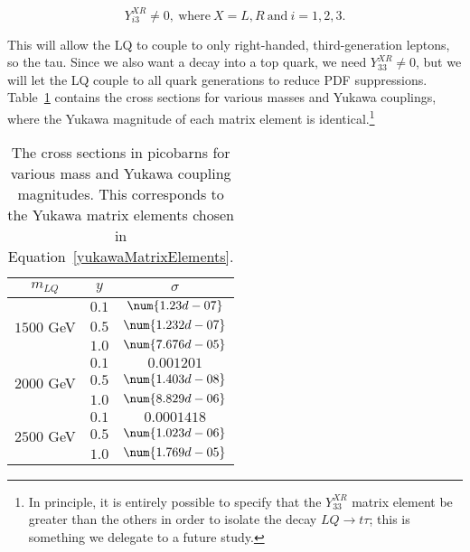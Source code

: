         \begin{equation}
            Y^{XR}_{i3} \neq 0,\ \text{where}\ X=L,R\ \text{and}\ i=1,2,3.
        \end{equation}\label{yukawaMatrixElements}

         This will allow the LQ to couple to only right-handed, third-generation leptons, so the tau. Since we also want a decay into a top quark, we need $Y^{XR}_{33} \neq 0$, but we will let the LQ couple to all quark generations to reduce PDF suppressions. Table~\ref{crossSections} contains the cross sections for various masses and Yukawa couplings, where the Yukawa magnitude of each matrix element is identical.\footnote{In principle, it is entirely possible to specify that the $Y^{XR}_{33}$ matrix element be greater than the others in order to isolate the decay $LQ \rightarrow t\tau$; this is something we delegate to a future study.}

        \renewcommand{\arraystretch}{1.15}
        \begin{table}[tbh]
            \centering
            \begin{tabular}{c|c|c}
                $m_{LQ}$ & $y$ & $\sigma$ \\ \hline
                \multirow{3}{5em}{$1500$ GeV} & $0.1$ & $\num{1.23d-07}$ \\ \cline{2-3}
                & $0.5$ & $\num{1.232d-07}$ \\ \cline{2-3}
                & $1.0$ & $\num{7.676d-05}$ \\ \hline
                \multirow{3}{5em}{$2000$ GeV} & $0.1$ & $\num{0.001201}$ \\ \cline{2-3}
                & $0.5$ & $\num{1.403d-08}$ \\ \cline{2-3}
                & $1.0$ & $\num{8.829d-06}$ \\ \hline
                \multirow{3}{5em}{$2500$ GeV} & $0.1$ & $\num{0.0001418}$ \\ \cline{2-3}
                & $0.5$ & $\num{1.023d-06}$ \\ \cline{2-3}
                & $1.0$ & $\num{1.769d-05}$ \\ \hline
            \end{tabular}
            \caption{The cross sections in picobarns for various mass and Yukawa coupling magnitudes. This corresponds to the Yukawa matrix elements chosen in Equation~\eqref{yukawaMatrixElements}.}
            \label{crossSections}
        \end{table}
        \renewcommand{\arraystretch}{1}

